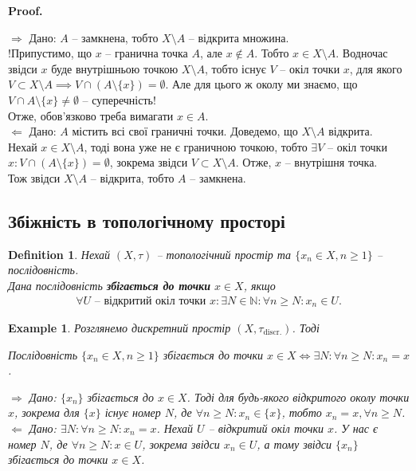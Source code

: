 \documentclass[a4paper, 10pt]{article}
\makeatletter
\def\rightproof{$\boxed{\Rightarrow}$ }
\def\leftproof{$\boxed{\Leftarrow}$ }
\theoremstyle{theoremdd}
\newtheorem{definition}[theorem]{Definition}
\newtheorem{example}[theorem]{Example}
\renewenvironment{proof}[1][Proof.\\]{\par
\pushQED{\hfill \qed}%
\normalfont \topsep6\p@\@plus6\p@\relax
\trivlist
\item\relax
{\bfseries
#1\@addpunct{.}}\hspace\labelsep\ignorespaces
}{%
\popQED\endtrivlist\@endpefalse
}
\makeatother
\begin{document}
\begin{proof}
\rightproof Дано: $A$ -- замкнена, тобто $X \setminus A$ -- відкрита множина.\\
!Припустимо, що $x$ -- гранична точка $A$, але $x \notin A$. Тобто $x \in X \setminus A$. Водночас звідси $x$ буде внутрішньою точкою $X \setminus A$, тобто існує $V$ -- окіл точки $x$, для якого $V \subset X \setminus A \implies V \cap (A \setminus \{x\}) = \emptyset$. Але для цього ж околу ми знаємо, що $V \cap A \setminus \{x\} \neq \emptyset$ -- суперечність!\\
Отже, обов'язково треба вимагати $x \in A$.
\bigskip \\
\leftproof Дано: $A$ містить всі свої граничні точки. Доведемо, що $X \setminus A$ відкрита.\\
Нехай $x \in X \setminus A$, тоді вона уже не є граничною точкою, тобто $\exists V$ -- окіл точки $x: V \cap (A \setminus \{x\}) = \emptyset$, зокрема звідси $V \subset X \setminus A$. Отже, $x$ -- внутрішня точка.\\
Тож звідси $X \setminus A$ -- відкрита, тобто $A$ -- замкнена.
\end{proof}

\subsection{Збіжність в топологічному просторі}
\begin{definition}
Нехай $(X,\tau)$ -- топологічний простір та $\{x_n \in X, n \geq 1\}$ -- послідовність.\\
Дана послідовність \textbf{збігається до точки} $x \in X$, якщо
\begin{align*}
\forall U \text{ -- відкритий окіл точки } x: \exists N \in \mathbb{N}: \forall n \geq N: x_n \in U.
\end{align*}
\end{definition}

\begin{example}
Розглянемо дискретний простір $(X,\tau_{\text{discr.}})$. Тоді
\begin{center}
Послідовність $\{x_n \in X, n \geq 1\}$ збігається до точки $x \in X \iff \exists N: \forall n \geq N: x_n = x$.
\end{center}
\rightproof Дано: $\{x_n\}$ збігається до $x \in X$. Тоді для будь-якого відкритого околу точки $x$, зокрема для $\{x\}$ існує номер $N$, де $\forall n \geq N: x_n \in \{x\}$, тобто $x_n = x, \forall n \geq N$.
\bigskip \\
\leftproof Дано: $\exists N: \forall n \geq N: x_n = x$. Нехай $U$ -- відкритий окіл точки $x$. У нас є номер $N$, де $\forall n \geq N: x \in U$, зокрема звідси $x_n \in U$, а тому звідси $\{x_n\}$ збігається до точки $x \in X$.
\end{example}
\end{document}
